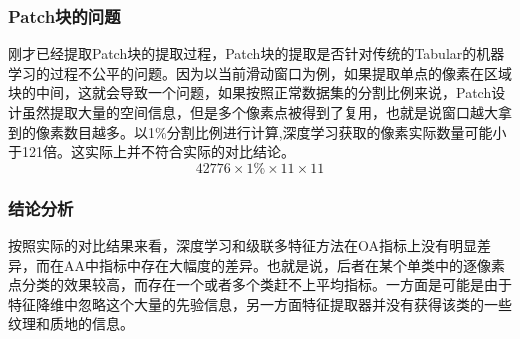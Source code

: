\documentclass[runningheads]{llncs}
\begin{document}
\subsubsection{Patch块的问题}
刚才已经提取Patch块的提取过程，Patch块的提取是否针对传统的Tabular的机器学习的过程不公平的问题。因为以当前滑动窗口为例，如果提取单点的像素在区域块的中间，这就会导致一个问题，如果按照正常数据集的分割比例来说，Patch设计虽然提取大量的空间信息，但是多个像素点被得到了复用，也就是说窗口越大拿到的像素数目越多。以1\%分割比例进行计算,深度学习获取的像素实际数量可能小于121倍。这实际上并不符合实际的对比结论。
$$42776\times1\% \times 11\times11$$
\subsubsection{结论分析}
按照实际的对比结果来看，深度学习和级联多特征方法在OA指标上没有明显差异，而在AA中指标中存在大幅度的差异。也就是说，后者在某个单类中的逐像素点分类的效果较高，而存在一个或者多个类赶不上平均指标。一方面是可能是由于特征降维中忽略这个大量的先验信息，另一方面特征提取器并没有获得该类的一些纹理和质地的信息。



%
\end{document}
